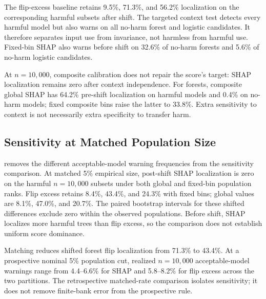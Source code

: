 \documentclass[conference]{IEEEtran}
\begin{document}
The flip-excess baseline retains 9.5\%, 71.3\%, and 56.2\% localization on the corresponding harmful subsets after shift. The targeted context test detects every harmful model but also warns on all no-harm forest and logistic candidates. It therefore separates input use from invariance, not harmless from harmful use. Fixed-bin SHAP also warns before shift on 32.6\% of no-harm forests and 5.6\% of no-harm logistic candidates.

At $n=10{,}000$, composite calibration does not repair the score's target: SHAP localization remains zero after context independence. For forests, composite global SHAP has 64.2\% pre-shift localization on harmful models and 0.4\% on no-harm models; fixed composite bins raise the latter to 33.8\%. Extra sensitivity to context is not necessarily extra specificity to transfer harm.

\subsection{Sensitivity at Matched Population Size}
 removes the different acceptable-model warning frequencies from the sensitivity comparison. At matched 5\% empirical size, post-shift SHAP localization is zero on the harmful $n=10{,}000$ subsets under both global and fixed-bin population ranks. Flip excess retains 8.4\%, 43.4\%, and 24.3\% with fixed bins; global values are 8.1\%, 47.0\%, and 20.7\%. The paired bootstrap intervals for these shifted differences exclude zero within the observed populations. Before shift, SHAP localizes more harmful trees than flip excess, so the comparison does not establish uniform score dominance.

\begin{table}[t]
\centering
\caption{Localization (\%) at retrospectively matched 5\% empirical acceptable-model warnings, $n=10{,}000$. Harm-positive counts: 46/100/150 (tree/forest/logistic). Shifted difference is flip minus SHAP, in percentage points; intervals resample calibration pairs and evaluated cases. Zero observed localization is not a population power bound.}
\label{tab:matched-population}
\footnotesize

\end{table}

Matching reduces shifted forest flip localization from 71.3\% to 43.4\%. At a prospective nominal 5\% population cut, realized $n=10{,}000$ acceptable-model warnings range from 4.4--6.6\% for SHAP and 5.8--8.2\% for flip excess across the two partitions. The retrospective matched-rate comparison isolates sensitivity; it does not remove finite-bank error from the prospective rule.
\end{document}
